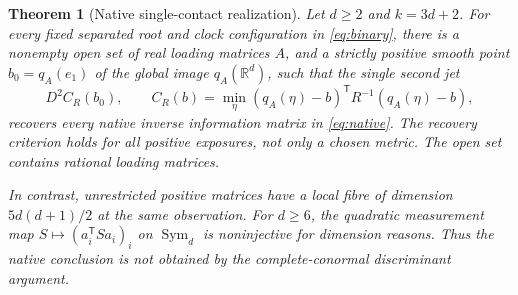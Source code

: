 \documentclass[11pt,reqno]{amsart}
\numberwithin{equation}{section}
\newtheorem{theorem}{Theorem}[section]
\theoremstyle{definition}\newtheorem{definition}[theorem]{Definition}
\theoremstyle{remark}\newtheorem{remark}[theorem]{Remark}
\newcommand{\R}{\mathbb R}
\newcommand{\Sym}{\operatorname{Sym}}
\begin{document}
\begin{theorem}[Native single-contact realization]\label{thm:realization}
Let $d\ge2$ and $k=3d+2$. For every fixed separated root and clock configuration in \eqref{eq:binary}, there is a nonempty open set of real loading matrices $A$, and a strictly positive smooth point $b_0=q_A(e_1)$ of the global image $q_A(\R^d)$, such that the single second jet
\[
 D^2C_R(b_0),\qquad C_R(b)=\min_\eta(q_A(\eta)-b)^{\mathsf T}R^{-1}(q_A(\eta)-b),
\]
recovers every native inverse information matrix in \eqref{eq:native}. The recovery criterion holds for all positive exposures, not only a chosen metric. The open set contains rational loading matrices.

In contrast, unrestricted positive matrices have a local fibre of dimension $5d(d+1)/2$ at the same observation. For $d\ge6$, the quadratic measurement map $S\mapsto(a_i^{\mathsf T}Sa_i)_i$ on $\Sym_d$ is noninjective for dimension reasons. Thus the native conclusion is not obtained by the complete-conormal discriminant argument.
\end{theorem}
\end{document}
